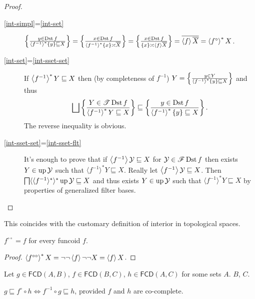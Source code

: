 \begin{proof}
  ~
  \begin{description}
    \item[\ref{int-simpl}=\ref{int-set}] $\left\{ \frac{ y \in \operatorname{Dst} f }{
    \left\langle f^{- 1}\right\rangle ^{\ast} \{ y \} \sqsubseteq X }\right\} = \left\{ \frac{ x \in
    \operatorname{Dst} f }{ \left\langle f^{- 1}\right\rangle ^{\ast} \{
    x \} \asymp \overline{X} }\right\} = \left\{ \frac{ x \in \operatorname{Dst} f
    }{ \{ x \} \asymp \left\langle f\right\rangle
    \overline{X} }\right\} = \overline{\left\langle f\right\rangle \overline{X}} =
    \left\langle f^{\circ}\right\rangle ^{\ast} X$.
    
    \item[\ref{int-set}=\ref{int-sset-set}] If $\left\langle f^{- 1}\right\rangle ^{\ast} Y \sqsubseteq X$ then (by
    completeness of $f^{- 1}$) $Y = \left\{ \frac{ y \in Y }{
    \left\langle f^{- 1}\right\rangle ^{\ast} \{ y \} \sqsubseteq X }\right\}$ and thus
    \[ \bigsqcup \setcond{ Y \in \mathscr{T} \Dst f }
       { \rsupfun{f^{- 1}} Y \sqsubseteq X }
       \sqsubseteq \setcond{ y \in \Dst f }{
       \rsupfun{f^{- 1}} \{ y \} \sqsubseteq X } . \]
    The reverse inequality is obvious.
    
    \item[\ref{int-sset-set}=\ref{int-sset-flt}] It's enough to prove that if $\left\langle f^{- 1}\right\rangle
    \mathcal{Y} \sqsubseteq X$ for $\mathcal{Y} \in \mathscr{F} \operatorname{Dst} f$
    then exists $Y \in \operatorname{up} \mathcal{Y}$ such that $\langle f^{- 1}
    \rangle^{\ast} Y \sqsubseteq X$. Really let $\left\langle f^{- 1}\right\rangle
    \mathcal{Y} \sqsubseteq X$. Then $\bigsqcap \langle \langle f^{- 1}
    \rangle^{\ast} \rangle^{\ast} \operatorname{up} \mathcal{Y} \sqsubseteq X$ and
    thus exists $Y \in \operatorname{up} \mathcal{Y}$ such that $\langle f^{- 1}
    \rangle^{\ast} Y \sqsubseteq X$ by properties of generalized filter bases.
  \end{description}
\end{proof}

This coincides with the customary definition of interior in topological
spaces.

\begin{prop}
  $f^{\circ \circ} = f$ for every funcoid $f$.
\end{prop}

\begin{proof}
  $\left\langle f^{\circ\circ}\right\rangle ^{\ast} X = \neg \neg \left\langle f\right\rangle
  \neg \neg X = \left\langle f\right\rangle X$.
\end{proof}

\begin{prop}\label{get-rid-interior}
  Let $g \in \mathsf{FCD} (A , B)$, $f \in \mathsf{FCD} (B ,
  C)$, $h \in \mathsf{FCD} (A , C)$ for some sets $A$. $B$, $C$.
  
  $g \sqsubseteq f^{\circ} \circ h \Leftrightarrow f^{- 1} \circ g \sqsubseteq
  h$, provided $f$ and $h$ are co-complete.
\end{prop}

